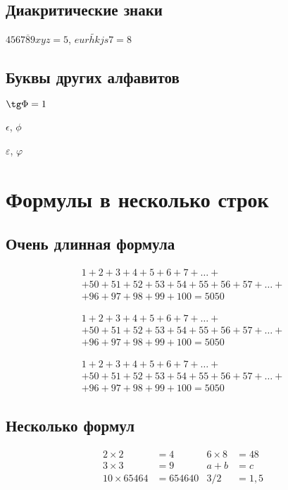\documentclass[a4paper,12pt]{article} %
\begin{document}
\subsection{Диакритические знаки}

$\overline{456789xyz}=5$, $\widetilde{eurhkjs7} = 8$

\subsection{Буквы других алфавитов}

$\tg \Phi = 1$

$\epsilon$, $\phi$

$\varepsilon$, $\varphi$

\section{Формулы в несколько строк}

\subsection{Очень длинная формула}

\begin{multline}
1+ 2+3+4+5+6+7+\dots + \\ 
+ 50+51+52+53+54+55+56+57 + \dots + \\ 
+ 96+97+98+99+100=5050
\end{multline}

\begin{multline*}
1+ 2+3+4+5+6+7+\dots + \\ 
+ 50+51+52+53+54+55+56+57 + \dots + \\ 
+ 96+97+98+99+100=5050
\end{multline*}

\begin{multline}
	1+ 2+3+4+5+6+7+\dots + \\ 
	+ 50+51+52+53+54+55+56+57 + \dots + \\ 
	+ 96+97+98+99+100=5050 \tag{S} \label{eq:sum}
\end{multline}


\subsection{Несколько формул}

\begin{align}
2\times 2 &= 4 & 6\times 8 &= 48 \\
3\times 3 &= 9 & a+b &= c\\
10 \times 65464 &= 654640 & 3/2&=1,5
\end{align}
\end{document}
